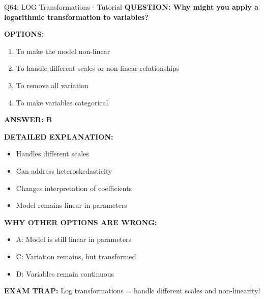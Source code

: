 \documentclass[8pt]{beamer}
\begin{document}
	\begin{frame}{Q64: LOG Transformations - Tutorial}
		\fontsize{6.5}{7.5}\selectfont
		\textbf{QUESTION: Why might you apply a logarithmic transformation to variables?}
		
		\vspace{0.1cm}
		\textbf{OPTIONS:}
		\begin{enumerate}
			\item To make the model non-linear
			\item To handle different scales or non-linear relationships
			\item To remove all variation
			\item To make variables categorical
		\end{enumerate}
		
		\vspace{0.1cm}
		\textcolor{myblue}{\textbf{ANSWER: B}}
		
		\vspace{0.1cm}
		\textbf{DETAILED EXPLANATION:}
		\begin{itemize}
			\item Handles different scales
			\item Can address heteroskedasticity
			\item Changes interpretation of coefficients
			\item Model remains linear in parameters
		\end{itemize}
		
		\vspace{0.1cm}
		\textcolor{myred}{\textbf{WHY OTHER OPTIONS ARE WRONG:}}
		\begin{itemize}
			\item \textcolor{myred}{A:} Model is still linear in parameters
			\item \textcolor{myred}{C:} Variation remains, but transformed
			\item \textcolor{myred}{D:} Variables remain continuous
		\end{itemize}
		
		\textcolor{myred}{\textbf{EXAM TRAP:}} Log transformations = \textcolor{myblue}{handle different scales and non-linearity}!
	\end{frame}
	
\end{document}
